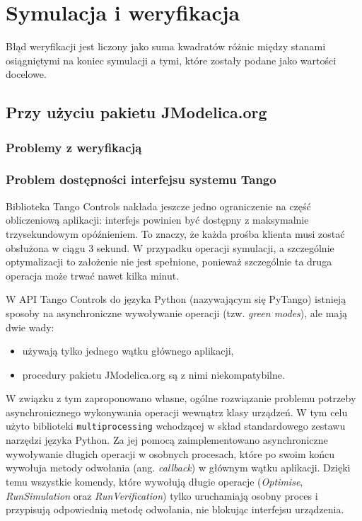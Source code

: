 \section{Symulacja i weryfikacja}
\label{sec:sym-wer}

Błąd weryfikacji jest liczony jako suma kwadratów różnic między stanami osiągniętymi na koniec symulacji a tymi, które zostały podane jako wartości docelowe.

\subsection{Przy użyciu pakietu JModelica.org}
\label{sub:sym-wer-jmodelica}



\subsubsection{Problemy z weryfikacją}

\subsubsection{Problem dostępności interfejsu systemu Tango}

Biblioteka Tango Controls nakłada jeszcze jedno ograniczenie na część obliczeniową aplikacji: interfejs powinien być dostępny z maksymalnie trzysekundowym opóźnieniem. To znaczy, że każda prośba klienta musi zostać obsłużona w ciągu 3 sekund. W przypadku operacji symulacji, a szczególnie optymalizacji to założenie nie jest spełnione, ponieważ szczególnie ta druga operacja może trwać nawet kilka minut.

W API Tango Controls do języka Python (nazywającym się PyTango) istnieją sposoby na asynchroniczne wywoływanie operacji (tzw. \emph{green modes}), ale mają dwie wady:
\begin{itemize}
    \item używają tylko jednego wątku głównego aplikacji,
    \item procedury pakietu JModelica.org są z nimi niekompatybilne.
\end{itemize}

W związku z tym zaproponowano własne, ogólne rozwiązanie problemu potrzeby asynchronicznego wykonywania operacji wewnątrz klasy urządzeń. W tym celu użyto biblioteki \texttt{multiprocessing} wchodzącej w skład standardowego zestawu narzędzi języka Python. Za jej pomocą zaimplementowano asynchroniczne wywoływanie długich operacji w osobnych procesach, które po swoim końcu wywołuja metody odwołania (ang. \emph{callback}) w głównym wątku aplikacji. Dzięki temu wszystkie komendy, które wywołują długie operacje (\emph{Optimise}, \emph{RunSimulation} oraz \emph{RunVerification}) tylko uruchamiają osobny proces i przypisują odpowiednią metodę odwołania, nie blokując interfejsu urządzenia.

